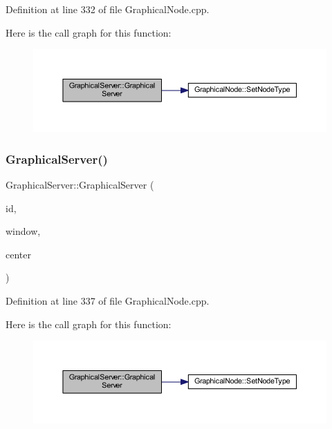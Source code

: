 Definition at line 332 of file Graphical\+Node.\+cpp.

Here is the call graph for this function\+:
\nopagebreak
\begin{figure}[H]
\begin{center}
\leavevmode
\includegraphics[width=350pt]{class_graphical_server_a676ae0f9427d8dae12256c6203127541_cgraph}
\end{center}
\end{figure}
\mbox{\label{class_graphical_server_a2690b914b1876f1eded21c1601803e93}} 
\subsubsection{\texorpdfstring{Graphical\+Server()}{GraphicalServer()}\hspace{0.1cm}{\footnotesize\ttfamily [2/2]}}
{\footnotesize\ttfamily Graphical\+Server\+::\+Graphical\+Server (\begin{DoxyParamCaption}\item[{\hyperlink{_graphical_element_8h_ade5fd6c85839a416577ff9de1605141e}{Element\+Key}}]{id,  }\item[{wx\+Window $\ast$}]{window,  }\item[{wx\+Point2\+D\+Double}]{center }\end{DoxyParamCaption})}



Definition at line 337 of file Graphical\+Node.\+cpp.

Here is the call graph for this function\+:
\nopagebreak
\begin{figure}[H]
\begin{center}
\leavevmode
\includegraphics[width=350pt]{class_graphical_server_a2690b914b1876f1eded21c1601803e93_cgraph}
\end{center}
\end{figure}


